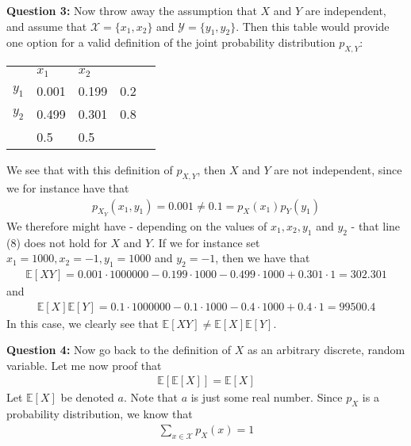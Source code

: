 \textbf{Question 3:} Now throw away the assumption that $X$ and $Y$ are independent, and assume that $\mathcal{X} = \{x_1, x_2\}$ and $\mathcal{Y} = \{y_1, y_2\}$. Then this table would provide one option for a valid definition of the joint probability distribution $p_{X,Y}$:
\begin{center}
\begin{tabular}{lllll}
                           & $x_1$                      & $x_2$                      &     &  \\ \cline{2-3}
\multicolumn{1}{l|}{$y_1$} & \multicolumn{1}{l|}{0.001} & \multicolumn{1}{l|}{0.199} & 0.2 &  \\ \cline{2-3}
\multicolumn{1}{l|}{$y_2$} & \multicolumn{1}{l|}{0.499} & \multicolumn{1}{l|}{0.301} & 0.8 &  \\ \cline{2-3}
                           & 0.5                        & 0.5                        &     & 
\end{tabular}
\end{center}

We see that with this definition of $p_{X,Y}$, then $X$ and $Y$ are not independent, since we for instance have that 
\begin{align}
p_{X_Y}(x_1,y_1)=0.001 \neq 0.1 = p_X(x_1)p_Y(y_1)
\end{align}
We therefore might have - depending on the values of $x_1, x_2, y_1$ and $y_2$ - that line (8) does not hold for $X$ and $Y$. If we for instance set $x_1 = 1000, x_2 = -1, y_1 = 1000$ and $y_2 = -1$, then we have that 
\begin{align}
\mathbb{E}[XY] = 0.001 \cdot 1000000 - 0.199 \cdot 1000 - 0.499 \cdot 1000 + 0.301 \cdot 1 = 302.301
\end{align}
and 
\begin{align}
\mathbb{E}[X]\mathbb{E}[Y] = 0.1 \cdot 1000000 - 0.1 \cdot 1000 - 0.4 \cdot 1000 + 0.4 \cdot 1 = 99500.4
\end{align}
In this case, we clearly see that $\mathbb{E}[XY] \neq \mathbb{E}[X]\mathbb{E}[Y]$.

\textbf{Question 4:} Now go back to the definition of $X$ as an arbitrary discrete, random variable. Let me now proof that 
\begin{align}
\mathbb{E}[\mathbb{E}[X]] =\mathbb{E}[X]
\end{align}
Let $\mathbb{E}[X]$ be denoted $a$. Note that $a$ is just some real number. Since $p_X$ is a probability distribution, we know that 
\begin{align}
 \sum_{x\in \mathcal{X}}p_X(x) = 1
\end{align}

